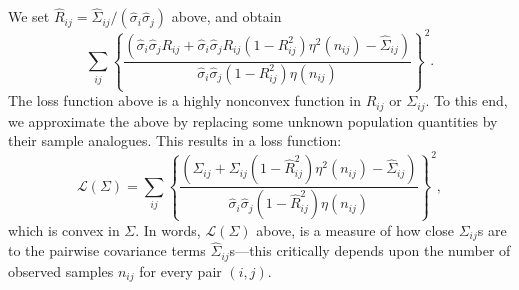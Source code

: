 We set  $\hat{R}_{ij} = \hat{\Sigma}_{ij}/(\hat{\sigma}_{i}\hat{\sigma}_j)$ above, and obtain 
$$\sum_{ij} \left \{ \frac{\left ( \hat{\sigma}_{i}\hat{\sigma}_{j}R_{ij} + \hat{\sigma}_{i}\hat{\sigma}_{j}R_{ij} (1-{R}^2_{ij})\eta^2(n_{ij}) - \hat{\Sigma}_{ij} \right )}{\hat{\sigma}_{i}\hat{\sigma}_{j} (1-{R}^2_{ij})\eta(n_{ij})} \right \}^2.$$
The loss function above is a highly nonconvex function in $R_{ij}$ or $\Sigma_{ij}$. To this end, we approximate the above by replacing some unknown population quantities by their sample analogues. This results in a loss function:
\begin{equation}\label{eq:defineL2}
\mathcal{L}(\Sigma)= \sum_{ij} \left \{ \frac{\left ( \Sigma_{ij} +  {\Sigma}_{ij} (1-\hat{R}^2_{ij})\eta^2(n_{ij}) - \hat{\Sigma}_{ij} \right )}{\hat{\sigma}_{i}\hat{\sigma}_{j} (1-\hat{R}^2_{ij})\eta(n_{ij})} \right \}^2,
\end{equation}
which is convex in $\Sigma$. In words, ${\mathcal L}(\Sigma)$ above, is a measure of how close $\Sigma_{ij}$s are to the pairwise covariance terms $\hat{\Sigma}_{ij}$s---this critically depends upon the number of observed samples $n_{ij}$ for every pair $(i,j)$.


